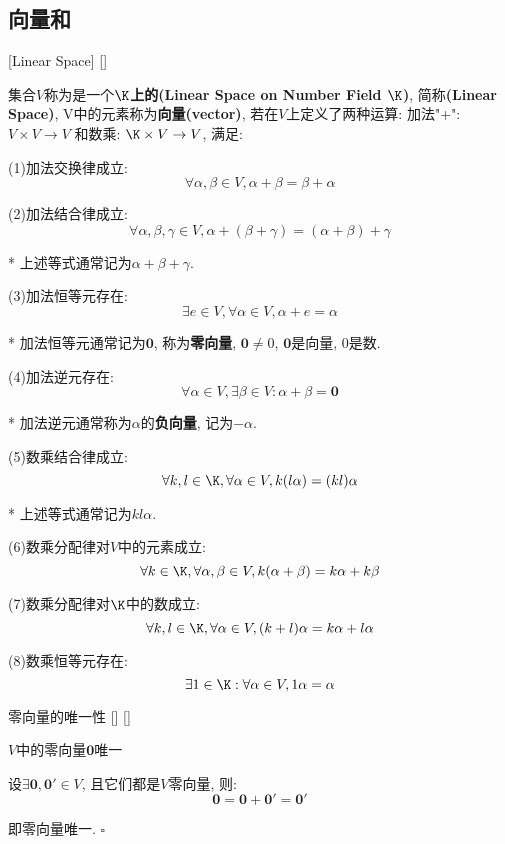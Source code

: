 \documentclass[UTF8]{ctexart}
\begin{document}
	\subsection{向量和}
		\begin{dfn}
			[Linear-Space]
			{}
			[Linear Space]
			[]

			集合$V$称为是一个\textbf{$\K$上的(Linear Space on Number Field $\K$)}, 简称\textbf{(Linear Space)}, V中的元素称为\textbf{向量(vector)}, 若在$V$上定义了两种运算: 加法"+": $V\times V\to V$ 和数乘: $\K\times V \to V$, 满足:

			(1)加法交换律成立: 
			\[\forall \alpha,\beta \in V, \alpha+\beta=\beta+\alpha\]

			(2)加法结合律成立: 
			\[\forall \alpha,\beta, \gamma \in V, \alpha+(\beta+\gamma)=(\alpha+\beta)+\gamma\]
			
			* 上述等式通常记为$\alpha+\beta+\gamma$. 

			(3)加法恒等元存在: 
			\[\exists e\in V, \forall \alpha \in V, \alpha +e=\alpha\]
			
			* 加法恒等元通常记为$\mathbf{0}$, 称为\textbf{零向量}, $\mathbf{0}\neq 0$, $\mathbf{0}$是向量, $0$是数. 

			(4)加法逆元存在: 
			\[\forall \alpha \in V, \exists \beta \in V: \alpha+\beta=\mathbf{0}\]
			
			* 加法逆元通常称为$\alpha$的\textbf{负向量}, 记为$-\alpha$. 

			(5)数乘结合律成立: 
			\[\forall k,l\in \K, \forall \alpha \in V, k(l\alpha) =(kl)\alpha\]
			
			* 上述等式通常记为$kl\alpha$. 

			(6)数乘分配律对$V$中的元素成立: 
			\[\forall k\in \K, \forall \alpha , \beta \in V, k(\alpha +\beta)=k\alpha+k\beta\]

			(7)数乘分配律对$\K$中的数成立: 
			\[\forall k,l\in \K, \forall \alpha \in V, (k+l)\alpha =k\alpha +l\alpha\]
			
			(8)数乘恒等元存在: 
			\[\exists 1\in \K: \forall \alpha \in V, 1\alpha=\alpha\]
		\end{dfn}
		
		\begin{ppt}
			[]
			{零向量的唯一性}
			[]
			[]

			$V$中的零向量$\mathbf{0}$唯一
		\end{ppt}
        \begin{prf}设$\exists \mathbf{0}, \mathbf{0}' \in V$, 且它们都是$V$零向量, 则: 
			\[\mathbf{0}=\mathbf{0}+\mathbf{0}'=\mathbf{0}'\]
			
			即零向量唯一. $\square$ 
        \end{prf}
		
\end{document}
